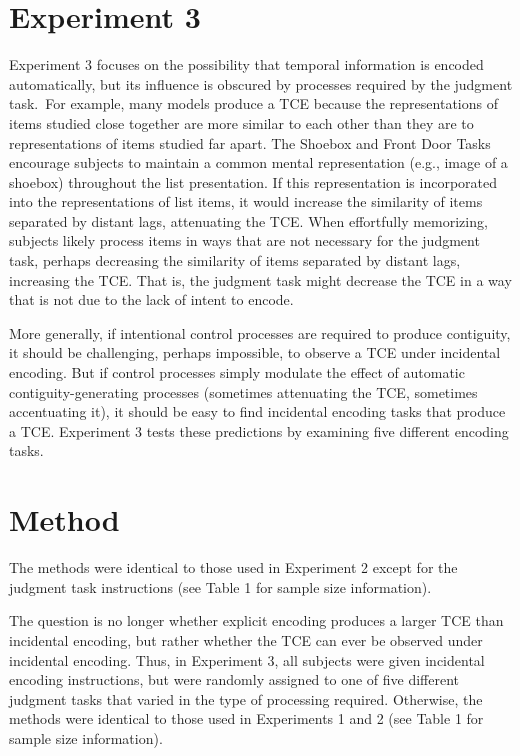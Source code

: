 \documentclass[man,natbib,floatsintext]{apa6} %
\begin{document}
\section{Experiment 3}
Experiment 3 focuses on the possibility that temporal information is encoded automatically, but its influence is obscured by processes required by the judgment task.\color{black}~For example, many models produce a TCE because the representations of items studied close together are more similar to each other than they are to representations of items studied far apart. The Shoebox and Front Door Tasks encourage subjects to maintain a common mental representation (e.g., image of a shoebox) throughout the list presentation. If this representation is incorporated into the representations of list items, it would increase the similarity of items separated by distant lags, attenuating the TCE. When effortfully memorizing, subjects likely process items in ways that are not necessary for the judgment task, perhaps decreasing the similarity of items separated by distant lags, increasing the TCE. That is, the judgment task might decrease the TCE in a way that is not due to the lack of intent to encode.

More generally, if intentional control processes are required to produce contiguity, it should be challenging, perhaps impossible, to observe a TCE under incidental encoding. But if control processes simply modulate the effect of automatic contiguity-generating processes (sometimes attenuating the TCE, sometimes accentuating it), it should be easy to find incidental encoding tasks that produce a TCE. Experiment 3 tests these predictions by examining five different encoding tasks.

\section{Method}
The methods were identical to those used in Experiment 2 except for the judgment task instructions (see Table 1 for sample size information).

The question is no longer whether explicit encoding produces a larger TCE than incidental encoding, but rather whether the TCE can ever be observed under incidental encoding. Thus, in Experiment 3, all subjects were given incidental encoding instructions, but were randomly assigned to one of five different judgment tasks that varied in the type of processing required. Otherwise, the methods were identical to those used in Experiments 1 and 2 (see Table 1 for sample size information).
\end{document}
